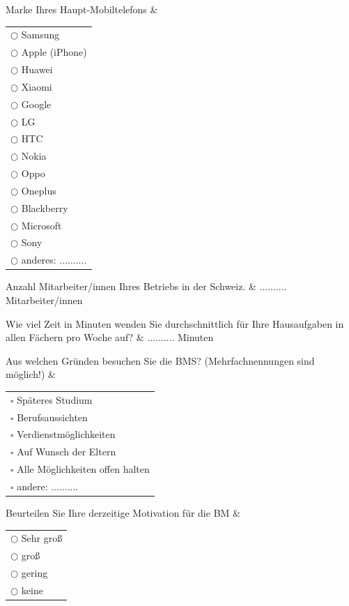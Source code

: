 \begin{befrage} 
   Marke Ihres Haupt-Mobiltelefons &
   \begin{tabular}[t]{l}
   $\bigcirc$ Samsung\\
   $\bigcirc$ Apple (iPhone)\\
   $\bigcirc$ Huawei\\
   $\bigcirc$ Xiaomi\\
   $\bigcirc$ Google\\
   $\bigcirc$ LG\\
   $\bigcirc$ HTC\\
   $\bigcirc$ Nokia\\
   $\bigcirc$ Oppo\\
   $\bigcirc$ Oneplus\\
   $\bigcirc$ Blackberry\\
   $\bigcirc$ Microsoft\\
   $\bigcirc$ Sony\\
   $\bigcirc$ anderes: ..........
   \end{tabular}
\end{befrage}


\begin{befrage}
 Anzahl Mitarbeiter/innen Ihres Betriebs in der Schweiz.   & .......... Mitarbeiter/innen
\end{befrage}


\begin{befrage}
  Wie viel Zeit in Minuten wenden Sie durchschnittlich für Ihre Hausaufgaben in allen Fächern pro Woche auf?  & .......... Minuten
\end{befrage}


\begin{befrage}
 Aus welchen Gründen besuchen Sie die BMS? (Mehrfachnennungen sind möglich!)   &
  \begin{tabular}[t]{p{4cm}}
   $\square$ Späteres Studium\\
   $\square$ Berufsaussichten\\
   $\square$ Verdienstmöglichkeiten\\
   $\square$ Auf Wunsch der Eltern\\
   $\square$ Alle Möglichkeiten offen halten\\
   $\square$ andere: ..........
   \end{tabular}
\end{befrage}


\begin{befrage}
  Beurteilen Sie Ihre derzeitige Motivation für die BM  &
   \begin{tabular}[t]{l}
   $\bigcirc$ Sehr groß\\
   $\bigcirc$ groß\\
   $\bigcirc$ gering\\
   $\bigcirc$ keine
   \end{tabular}
\end{befrage}



